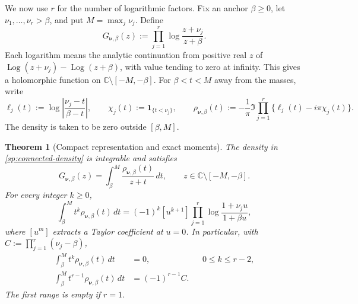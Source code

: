 \documentclass[11pt,letterpaper]{article}
\numberwithin{equation}{section}
\newtheorem{theorem}{Theorem}[section]
\theoremstyle{definition}
\theoremstyle{remark}
\DeclareMathOperator{\Log}{Log}
\begin{document}
We now use $r$ for the number of logarithmic factors.  Fix an
anchor $\beta\geq0$, let $\nu_1,\ldots,\nu_r>\beta$, and put
$M=\max_j\nu_j$.  Define
\begin{equation}
 G_{\boldsymbol\nu,\beta}(z)
 :=\prod_{j=1}^{r}
       \log\frac{z+\nu_j}{z+\beta}.
 \label{sp:connected-product}
\end{equation}
Each logarithm means the analytic continuation from positive
real $z$ of $\Log(z+\nu_j)-\Log(z+\beta)$, with value tending
to zero at infinity.  This gives a holomorphic function on
$\mathbb C\setminus[-M,-\beta]$.
For $\beta<t<M$ away from the masses, write
\begin{equation}
 \ell_j(t):=\log\left|\frac{\nu_j-t}{\beta-t}\right|,
 \qquad \chi_j(t):=\boldsymbol1_{\{t<\nu_j\}},
 \qquad
 \rho_{\boldsymbol\nu,\beta}(t)
 :=-\frac1\pi\Im\prod_{j=1}^{r}
                     \{\ell_j(t)-i\pi\chi_j(t)\}.
 \label{sp:connected-density}
\end{equation}
The density is taken to be zero outside $[\beta,M]$.

\begin{theorem}[Compact representation and exact moments]
\label{sp:compact-density}
The density in \eqref{sp:connected-density} is integrable and
satisfies
\begin{equation}
 G_{\boldsymbol\nu,\beta}(z)
 =\int_\beta^M\frac{\rho_{\boldsymbol\nu,\beta}(t)}{z+t}\,dt,
 \qquad z\in\mathbb C\setminus[-M,-\beta].
 \label{sp:compact-stieltjes}
\end{equation}
For every integer $k\geq0$,
\begin{equation}
 \int_\beta^M t^k\rho_{\boldsymbol\nu,\beta}(t)\,dt
 =(-1)^k[u^{k+1}]
       \prod_{j=1}^{r}\log\frac{1+\nu_j u}{1+\beta u},
 \label{sp:compact-moments}
\end{equation}
where $[u^m]$ extracts a Taylor coefficient at $u=0$.
In particular, with $C:=\prod_{j=1}^{r}(\nu_j-\beta)$,
\begin{align}
 \int_\beta^M t^k\rho_{\boldsymbol\nu,\beta}(t)\,dt&=0,
       &&0\leq k\leq r-2,\label{sp:vanishing-moments}\\
 \int_\beta^M t^{r-1}\rho_{\boldsymbol\nu,\beta}(t)\,dt
      &=(-1)^{r-1}C.
 \label{sp:first-nonzero-moment}
\end{align}
The first range is empty if $r=1$.
\end{theorem}
\end{document}
